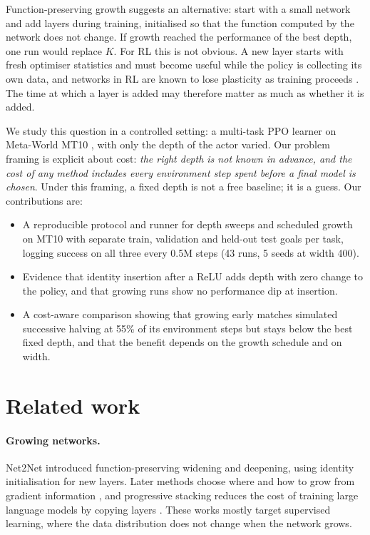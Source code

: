 \documentclass{article}
\begin{document}
Function-preserving growth \citep{chen2016net2net} suggests an alternative: start with a small network and add layers during training, initialised so that the function computed by the network does not change.
If growth reached the performance of the best depth, one run would replace $K$.
For RL this is not obvious.
A new layer starts with fresh optimiser statistics and must become useful while the policy is collecting its own data, and networks in RL are known to lose plasticity as training proceeds \citep{nikishin2022primacy,lyle2023plasticity}.
The time at which a layer is added may therefore matter as much as whether it is added.

We study this question in a controlled setting: a multi-task PPO learner \citep{schulman2017ppo,li2026toppo} on Meta-World MT10 \citep{yu2020metaworld}, with only the depth of the actor varied.
Our problem framing is explicit about cost: \emph{the right depth is not known in advance, and the cost of any method includes every environment step spent before a final model is chosen}.
Under this framing, a fixed depth is not a free baseline; it is a guess.
Our contributions are:
\begin{itemize}
    \item A reproducible protocol and runner for depth sweeps and scheduled growth on MT10 with separate train, validation and held-out test goals per task, logging success on all three every 0.5M steps (43 runs, 5 seeds at width 400).
    \item Evidence that identity insertion after a ReLU adds depth with zero change to the policy, and that growing runs show no performance dip at insertion.
    \item A cost-aware comparison showing that growing early matches simulated successive halving at 55\% of its environment steps but stays below the best fixed depth, and that the benefit depends on the growth schedule and on width.
\end{itemize}

\section{Related work}

\paragraph{Growing networks.}
Net2Net \citep{chen2016net2net} introduced function-preserving widening and deepening, using identity initialisation for new layers.
Later methods choose where and how to grow from gradient information \citep{evci2022gradmax,wu2020firefly}, and progressive stacking reduces the cost of training large language models by copying layers \citep{gong2019stacking}.
These works mostly target supervised learning, where the data distribution does not change when the network grows.
\end{document}
